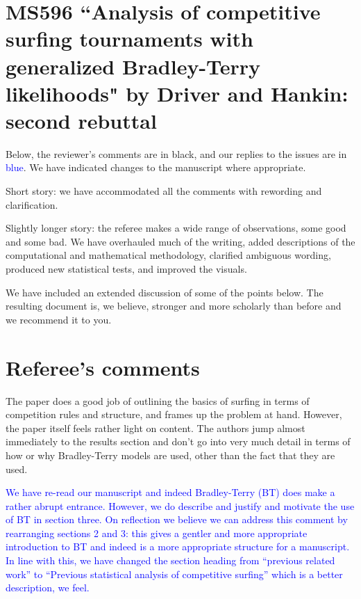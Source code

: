 \documentclass[12pt]{article}
\begin{document}
\section*{MS596 ``Analysis of competitive surfing tournaments
  with generalized Bradley-Terry likelihoods" by Driver and
  Hankin: second rebuttal}

Below, the reviewer's comments are in black, and our replies to the
issues are in \textcolor{blue}{blue}.  We have indicated changes to
the manuscript where appropriate.  

Short story: we have accommodated all the comments with rewording and
clarification.  

Slightly longer story: the referee makes a wide range of observations,
some good and some bad.  We have overhauled much of the writing, added
descriptions of the computational and mathematical methodology,
clarified ambiguous wording, produced new statistical tests, and
improved the visuals.

We have included an extended discussion of some of the points below.
The resulting document is, we believe, stronger and more scholarly
than before and we recommend it to you.


\section*{Referee's comments}

The paper does a good job of outlining the basics of surfing in terms
of competition rules and structure, and frames up the problem at
hand.  However, the paper itself feels rather light on content.  The
authors jump almost immediately to the results section and don't go
into very much detail in terms of how or why Bradley-Terry models are
used, other than the fact that they are used.

\textcolor{blue}{We have re-read our manuscript and indeed
  Bradley-Terry (BT) does make a rather abrupt entrance.  However, we
  do describe and justify and motivate the use of BT in section three.
  On reflection we believe we can address this comment by rearranging
  sections 2 and 3: this gives a gentler and more appropriate
  introduction to BT and indeed is a more appropriate structure for a
  manuscript.  In line with this, we have changed the section heading
  from ``previous related work'' to ``Previous statistical analysis of
  competitive surfing'' which is a better description, we feel.}
\end{document}
